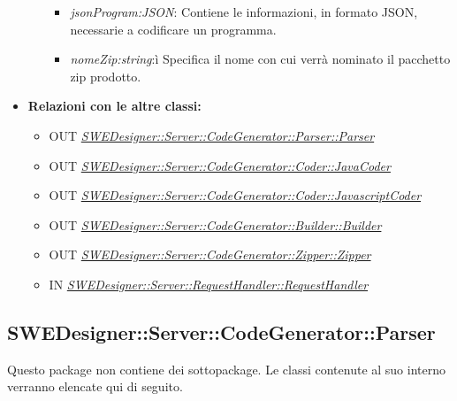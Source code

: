 \documentclass[../DefinizioneDiProdotto.tex]{subfiles}
\begin{document}
\begin{itemize}
\begin{itemize}
\begin{itemize}
						\item \emph{jsonProgram:JSON}: Contiene le informazioni, in formato JSON, necessarie a codificare un programma.\\
						\item \emph{nomeZip:string}:ì Specifica il nome con cui verrà nominato il pacchetto zip prodotto.\\
					\end{itemize}
				\end{itemize}				
				\item \textbf{Relazioni con le altre classi:}
				\begin{itemize}
					\item OUT \hyperlink{SWEDesigner::Server::CodeGenerator::Parser::Parser}{\emph{SWEDesigner::Server::CodeGenerator::Parser::Parser}}\\
					\item OUT \hyperlink{SWEDesigner::Server::CodeGenerator::Coder::JavaCoder}{\emph{SWEDesigner::Server::CodeGenerator::Coder::JavaCoder}}\\
					\item OUT \hyperlink{SWEDesigner::Server::CodeGenerator::Coder::JavascriptCoder}{\emph{SWEDesigner::Server::CodeGenerator::Coder::JavascriptCoder}}\\
					\item OUT \hyperlink{SWEDesigner::Server::CodeGenerator::Builder::Builder}{\emph{SWEDesigner::Server::CodeGenerator::Builder::Builder}}\\
					\item OUT \hyperlink{SWEDesigner::Server::CodeGenerator::Zipper::Zipper}{\emph{SWEDesigner::Server::CodeGenerator::Zipper::Zipper}}\\
					\item IN \hyperlink{SWEDesigner::Server::RequestHandler::RequestHandler}{\emph{SWEDesigner::Server::RequestHandler::RequestHandler}}\\
				\end{itemize}	
			\end{itemize}
			
				
			
			
			
			\subsection{SWEDesigner::Server::CodeGenerator::Parser}
			Questo package non contiene dei sottopackage.
			Le classi contenute al suo interno verranno elencate qui di seguito.
			
\end{document}
